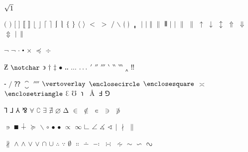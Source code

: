 \documentclass[captions=tableheading]{scrartcl}
\begin{document}
$\sqrtsign{1}$

$($
$)$
$[$
$]$
$\lBrack$
\let\dlb\lBrack
$\rBrack$
\let\drb\rBrack
$\lfloor$
$\rfloor$
$\lceil$
$\rceil$
$\lmoustache$
$\rmoustache$
$\lbrace$
$\rbrace$
$\langle$
$\rangle$
$<$
$>$
$/$
$\backslash$
$\lgroup$
$\rgroup$
$\bracevert$
$|$
$\vert$
$\Vert$
$\|$
$\Vvert$
$\lvert$
$\rvert$
$\lVert$
$\rVert$
$\uparrow$
$\downarrow$
$\updownarrow$
$\Uparrow$
$\Downarrow$
$\Updownarrow$
$\arrowvert$
$\Arrowvert$


$\neg$ $\lnot$
$\cdotp$ $\centerdot$
$\times$
$\preceq$
$\div$

$\Zbar$
$\notchar$
$\upbackepsilon$
$\dagger$
$\ddagger$
$\smblkcircle$
$\enleadertwodots$
$\unicodeellipsis$ $\mathellipsis$
$\prime$
$\dprime$
$\trprime$
$\backprime$
$\backdprime$
$\backtrprime$
$\caretinsert$
$\Exclam$

$\hyphenbullet$
$\fracslash$
$\Question$
$\closure$
$\qprime$
$\vertoverlay$
$\enclosecircle$
$\enclosesquare$
$\asymp$
$\enclosetriangle$
$\Eulerconst$
$\mho$
$\turnediota$
$\Angstrom$
$\Finv$
$\Game$

$\sansLturned$
$\sansLmirrored$
$\Yup$
$\upand$
$\forall$
$\complement$
$\exists$
$\nexists$
$\varnothing$
$\increment$
$\in$
$\notin$
$\smallin$
$\ni$
\let\owns=\ni
$\nni$

$\smallni$
$\QED$
$\dotplus$
$\succeq$
$\smallsetminus$
$\vysmwhtcircle$
$\vysmblkcircle$ $\bullet$
$\propto$
$\infty$
$\rightangle$
$\angle$
$\measuredangle$
$\sphericalangle$
$\mid$
$\nmid$
$\parallel$

$\nparallel$
$\wedge$ $\land$
$\vee$ $\lor$
$\cap$
$\cup$
$\therefore$
$\because$
$\emptyset$
$\Colon$
$\dotminus$
$\dashcolon$
$\dotsminusdots$
$\kernelcontraction$
$\sim$
$\backsim$
$\invlazys$
\end{document}
